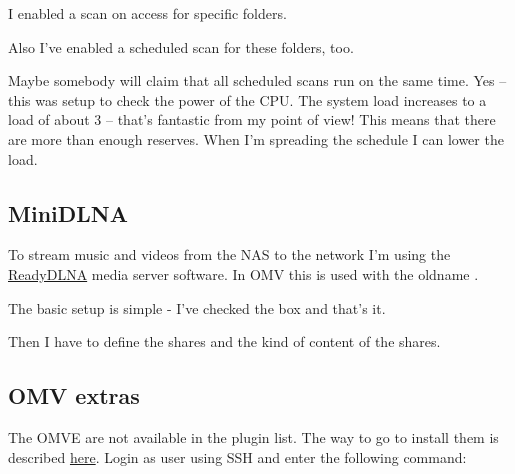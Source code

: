 I enabled a scan on access for specific folders.


Also I've enabled a scheduled scan for these folders, too.


Maybe somebody will claim that all scheduled scans run on the same time.\linebreak
Yes -- this was setup to check the power of the CPU. The system load increases
to a load of about 3 -- that's fantastic from my point of view! This means that
there are more than enough reserves. When I'm spreading the schedule I can
lower the load.


\subsection{MiniDLNA}

To stream music and videos from the \gls{NAS} to the network I'm using the
\href{https://sourceforge.net/projects/minidlna/}{ReadyDLNA} media server
software. In \gls{OMV} this is used with the oldname .


The basic setup is simple - I've checked the  box and that's
it.


Then I have to define the shares and the kind of content of the shares.


\subsection{OMV extras}

The \gls{OMVE} are not available in the plugin list. The way to go to install
them is described \href{https://forum.openmediavault.org/index.php?thread/39594-omvextras-for-omv6/}{here}.
Login as user  using SSH and enter the following command:

